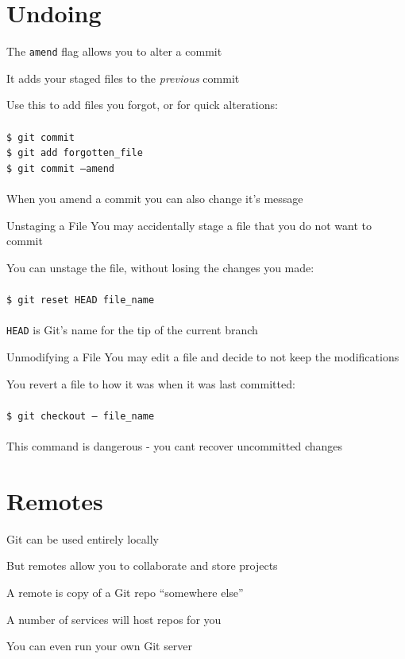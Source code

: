 \documentclass{beamer}
\begin{document}
\section{Undoing}
\begin{frame}{\secname}
    The {\tt amend} flag allows you to alter a commit

    It adds your staged files to the {\it previous} commit 

    Use this to add files you forgot, or for quick alterations:\\~\\
    {\tt \$ git commit\\
    \$ git add forgotten\_file\\
    \$ git commit --amend} \\~\\

    When you amend a commit you can also change it's message
\end{frame}

\begin{frame}{Unstaging a File}
    You may accidentally stage a file that you do not want to commit

    You can unstage the file, without losing the changes you made:\\~\\
    {\tt \$ git reset HEAD file\_name} \\~\\
    {\tt HEAD} is Git's name for the tip of the current branch   
\end{frame}

\begin{frame}{Unmodifying a File}
    You may edit a file and decide to not keep the modifications

    You revert a file to how it was when it was last committed: \\~\\
    
    {\tt \$ git checkout -- file\_name} \\~\\

    This command is dangerous - you cant recover uncommitted changes
\end{frame}

\section{Remotes}
\begin{frame}[allowframebreaks]{\secname}
    Git can be used entirely locally

    But remotes allow you to collaborate and store projects

    A remote is copy of a Git repo ``somewhere else''

    A number of services will host repos for you

    You can even run your own Git server

\end{frame}
\end{document}
